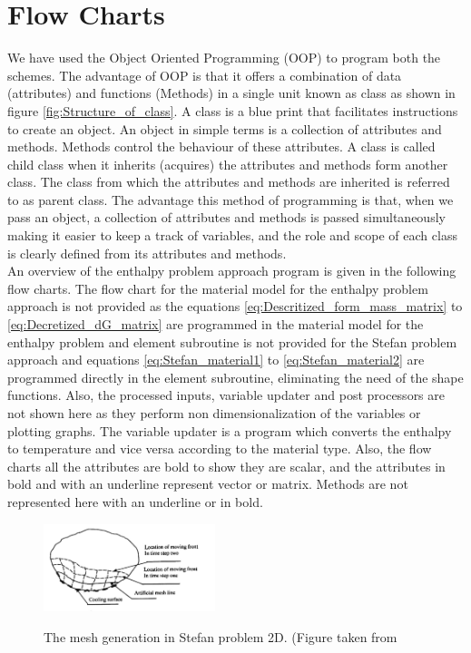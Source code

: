 \section{Flow Charts\label{sec:Flowcharts}}
We have used the Object Oriented Programming (OOP) to program both the schemes. The advantage of OOP is that it offers a combination of data (attributes) and functions (Methods) in a single unit known as class as shown in figure \ref{fig:Structure_of_class}. A class is a blue print that facilitates instructions to create an object. An object in simple terms is a collection of attributes and methods. Methods control the behaviour of these attributes. A class is called child class when it inherits (acquires) the attributes and methods form another class. The class from which the attributes and methods are inherited is referred to as parent class. The advantage this method of programming is that, when we pass an object, a collection of attributes and methods is passed simultaneously making it easier to keep a track of variables, and the role and scope of each class is clearly defined from its attributes and methods.\\
An overview of the enthalpy problem approach program is given in the following flow charts. The flow chart for the material model for the enthalpy problem approach is not provided as the equations \eqref{eq:Descritized_form_mass_matrix} to \eqref{eq:Decretized_dG_matrix} are programmed in the material model for the enthalpy problem and element subroutine is not provided for the Stefan problem approach and equations \ref{eq:Stefan_material1} to \ref{eq:Stefan_material2} are programmed directly in the element subroutine, eliminating the need of the shape functions. Also, the processed inputs, variable updater and post processors are not shown here as they perform non dimensionalization of the variables or plotting graphs. The variable updater is a program which converts the enthalpy to temperature and vice versa according to the material type. Also, the flow charts all the attributes are bold to show they are scalar, and the attributes in bold and with an underline represent vector or matrix. Methods are not represented here with an underline or in bold.\\ 
\begin{figure}[htb]
  \centering
  \includegraphics[width=5cm]{img/Newstefanproblemakjfjk.png}\\
  \caption{The mesh generation in Stefan problem 2D. (Figure taken from \cite{Wu+2005+281+288}}
  \label{fig:New mesh generation}
\end{figure}
